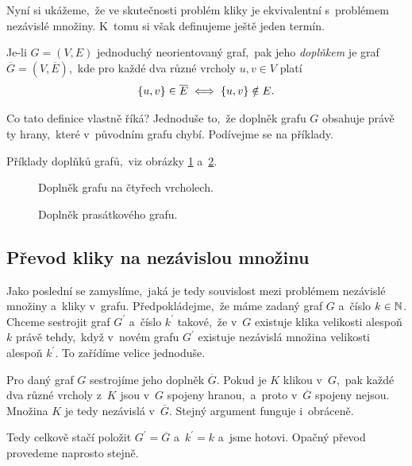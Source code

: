 Nyní si ukážeme,~že ve skutečnosti problém kliky je ekvivalentní s~problémem nezávislé množiny. K~tomu si však definujeme ještě jeden termín.
\begin{definition}
    Je-li $G=(V,E)$ jednoduchý neorientovaný graf,~pak jeho \emph{doplňkem} je graf $\overline{G}=(V,\overline{E})$,~kde pro každé dva různé vrcholy $u,v\in V$ platí
    \[\left\{u,v\right\}\in\overline{E}\iff\left\{u,v\right\}\notin E.\]
\end{definition}
Co tato definice vlastně říká? Jednoduše to,~že doplněk grafu $G$ obsahuje právě ty hrany,~které v~původním grafu chybí. Podívejme se na příklady.
\begin{example}
    Příklady doplňků grafů,~viz obrázky \ref{fig:doplnek_grafu1} a~\ref{fig:doplnek_grafu2}.
    \begin{figure}[ht]
        \centering
        
        \caption{Doplněk grafu na čtyřech vrcholech.}
        \label{fig:doplnek_grafu1}
    \end{figure}
    \begin{figure}[ht]
        \centering
        
        \caption{Doplněk prasátkového grafu.}
        \label{fig:doplnek_grafu2}
    \end{figure}
\end{example}

\subsection{Převod kliky na nezávislou množinu}\label{subsec:prevod_klika_nzmna}

Jako poslední se zamyslíme,~jaká je tedy souvislost mezi problémem nezávislé množiny a~kliky v~grafu. Předpokládejme,~že máme zadaný graf $G$ a~číslo $k\in\mathbb{N}$. Chceme sestrojit graf $G^\prime$ a~číslo $k^\prime$ takové,~že v~$G$ existuje klika velikosti alespoň $k$ právě tehdy,~když v~novém grafu $G^\prime$ existuje nezávislá množina velikosti alespoň $k^\prime$. To zařídíme velice jednoduše.

Pro daný graf $G$ sestrojíme jeho doplněk $\overline{G}$. Pokud je $K$ klikou v~$G$,~pak každé dva různé vrcholy z~$K$ jsou v~$G$ spojeny hranou,~a~proto v~$\overline{G}$ spojeny nejsou. Množina $K$ je tedy nezávislá v~$\overline{G}$. Stejný argument funguje i~obráceně.

Tedy celkově stačí položit $G^\prime=\overline{G}$ a~$k^\prime=k$ a~jsme hotovi. Opačný převod provedeme naprosto stejně.
